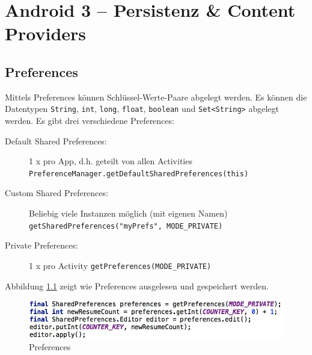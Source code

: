 \chapter{Android 3 – Persistenz \& Content Providers}

\section{Preferences}

Mittels Preferences können Schlüssel-Werte-Paare abgelegt werden. Es können die Datentypen \texttt{String}, \texttt{int}, \texttt{long}, \texttt{float}, \texttt{boolean} und \texttt{Set<String>} abgelegt werden. Es gibt drei verschiedene Preferences:
\begin{description}
	\item[Default Shared Preferences:] 1 x pro App, d.h. geteilt von allen Activities \texttt{PreferenceManager.getDefaultSharedPreferences(this)}
	\item[Custom Shared Preferences:] Beliebig viele Instanzen möglich (mit eigenen Namen) \texttt{getSharedPreferences("myPrefs", MODE\_PRIVATE)}
	\item[Private Preferences:] 1 x pro Activity \texttt{getPreferences(MODE\_PRIVATE)}
\end{description}
Abbildung \ref{fig:preferences} zeigt wie Preferences ausgelesen und gespeichert werden.
\begin{figure}
\centering
\includegraphics[width=\linewidth]{fig/preferences}
\caption{Preferences}
\label{fig:preferences}
\end{figure}


